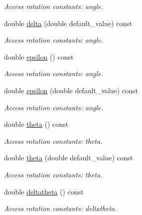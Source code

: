 \begin{DoxyCompactItemize}
\begin{DoxyCompactList}\small\item\em Access rotation constants: angle. \item\end{DoxyCompactList}\item 
double \hyperlink{struct_d_d4hep_1_1_x_m_l_1_1_dimension_adb9ab339cb1e07633480c50bf8450b03}{delta} (double default\_\-value) const 
\begin{DoxyCompactList}\small\item\em Access rotation constants: angle. \item\end{DoxyCompactList}\item 
double \hyperlink{struct_d_d4hep_1_1_x_m_l_1_1_dimension_aaf9ced472cc0e602d162e32197d314a5}{epsilon} () const 
\begin{DoxyCompactList}\small\item\em Access rotation constants: angle. \item\end{DoxyCompactList}\item 
double \hyperlink{struct_d_d4hep_1_1_x_m_l_1_1_dimension_adceda3c2c92d5361fff7189da5e5feb8}{epsilon} (double default\_\-value) const 
\begin{DoxyCompactList}\small\item\em Access rotation constants: angle. \item\end{DoxyCompactList}\item 
double \hyperlink{struct_d_d4hep_1_1_x_m_l_1_1_dimension_ad7ba8d621c5b9d8814eb2133c7986519}{theta} () const 
\begin{DoxyCompactList}\small\item\em Access rotation constants: theta. \item\end{DoxyCompactList}\item 
double \hyperlink{struct_d_d4hep_1_1_x_m_l_1_1_dimension_a2f5a8493ac129c76a5c8af329ea9a691}{theta} (double default\_\-value) const 
\begin{DoxyCompactList}\small\item\em Access rotation constants: theta. \item\end{DoxyCompactList}\item 
double \hyperlink{struct_d_d4hep_1_1_x_m_l_1_1_dimension_a0f96892cc9cbfe14514df0d7a5239210}{deltatheta} () const 
\begin{DoxyCompactList}\small\item\em Access rotation constants: deltatheta. \item\end{DoxyCompactList}\item 

\end{DoxyCompactItemize}
